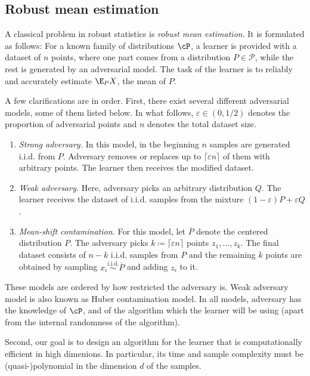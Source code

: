 
\subsection{Robust mean estimation}
A classical problem in robust statistics is \textit{robust mean estimation}.
It is formulated as follows: 
For a known family of distributions \(\cP\), a learner is provided with a dataset of \(n\) points, where one part comes from a distribution \(P \in \mathcal{P}\), 
while the rest is generated by an adversarial model. 
The task of the learner is to reliably and accurately estimate \(\E_{P} X\), the mean of \(P\).

A few clarifications are in order. 
First, there exist several different adversarial models, some of them listed below.
In what follows, \(\varepsilon \in (0, 1/2)\) denotes the proportion of adversarial points and \(n\) denotes the total dataset size.
\begin{enumerate}
    \item \textit{Strong adversary.} In this model, in the beginning \(n\) samples are generated i.i.d. from \(P\). 
    Adversary removes or replaces up to \(\lceil \varepsilon n \rceil\) of them with arbitrary points.
    The learner then receives the modified dataset.
    \item \textit{Weak adversary.} Here, adversary picks an arbitrary distribution \(Q\).
    The learner receives the dataset of i.i.d. samples from the mixture \((1 - \varepsilon) P + \varepsilon Q\).
    \item \textit{Mean-shift contamination.} For this model, let \(\overline{P}\) denote the centered distribution \(P\).
    The adversary picks \(k \coloneqq \lceil \varepsilon n \rceil\) points \(z_1, \ldots, z_k\).
    The final dataset consists of \(n - k\) i.i.d. samples from \(P\) and the remaining \(k\) points are obtained by sampling \(x_i \overset{\mathrm{i.i.d.}}{\sim} \overline{P}\) and adding \(z_i\) to it.
\end{enumerate}
\noindent
These models are ordered by how restricted the adversary is. Weak adversary model is also known as Huber contamination model.
In all models, adversary has the knowledge of \(\cP\), and of the algorithm which the learner will be using (apart from the internal randomness of the algorithm).

Second, our goal is to design an algorithm for the learner that is computationally efficient in high dimenions.
In particular, its time and sample complexity must be (quasi-)polynomial in the dimension \(d\) of the samples.

